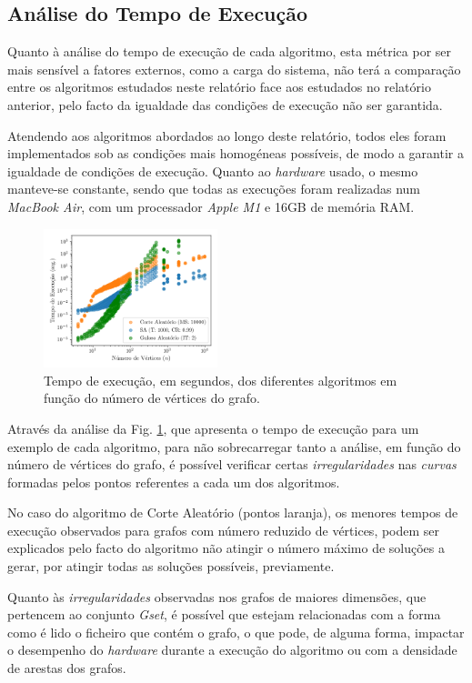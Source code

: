 \documentclass[mirror, portugues]{revdetua}
\begin{document}
\subsection{Análise do Tempo de Execução}

Quanto à análise do tempo de execução de cada algoritmo, esta métrica por ser mais sensível a fatores externos, como a carga do sistema, não terá a comparação entre os algoritmos estudados neste relatório face aos estudados no relatório anterior, pelo facto da igualdade das condições de execução não ser garantida.

Atendendo aos algoritmos abordados ao longo deste relatório, todos eles foram implementados sob as condições mais homogéneas possíveis, de modo a garantir a igualdade de condições de execução. Quanto ao \textit{hardware} usado, o mesmo manteve-se constante, sendo que todas as execuções foram realizadas num \textit{MacBook Air}, com um processador \textit{Apple M1} e 16GB de memória RAM.


\begin{figure}[H]
    \centering
    \includegraphics[width=0.45\textwidth]{../assets/time_all.png}
    \caption{Tempo de execução, em segundos, dos diferentes algoritmos em função do número de vértices do grafo.}
    \label{fig:time_all}
\end{figure}

Através da análise da Fig. \ref{fig:time_all}, que apresenta o tempo de execução para um exemplo de cada algoritmo, para não sobrecarregar tanto a análise, em função do número de vértices do grafo, é possível verificar certas \textit{irregularidades} nas \textit{curvas} formadas pelos pontos referentes a cada um dos algoritmos.

No caso do algoritmo de Corte Aleatório (pontos laranja), os menores tempos de execução observados para grafos com número reduzido de vértices, podem ser explicados pelo facto do algoritmo não atingir o número máximo de soluções a gerar, por atingir todas as soluções possíveis, previamente.

Quanto às \textit{irregularidades} observadas nos grafos de maiores dimensões, que pertencem ao conjunto \textit{Gset}, é possível que estejam relacionadas com a forma como é lido o ficheiro que contém o grafo, o que pode, de alguma forma, impactar o desempenho do \textit{hardware} durante a execução do algoritmo ou com a densidade de arestas dos grafos.
\end{document}
